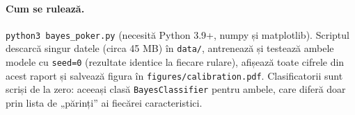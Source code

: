 \documentclass[10pt,a4paper]{article}
\begin{document}
\paragraph{Cum se rulează.} \texttt{python3 bayes\_poker.py} (necesită
Python 3.9+, numpy și matplotlib). Scriptul descarcă singur datele (circa
45 MB) în \texttt{data/}, antrenează și testează ambele modele cu
\texttt{seed=0} (rezultate identice la fiecare rulare), afișează toate cifrele
din acest raport și salvează figura în \texttt{figures/calibration.pdf}.
Clasificatorii sunt scriși de la zero: aceeași clasă \texttt{BayesClassifier}
pentru ambele, care diferă doar prin lista de „părinți'' ai fiecărei
caracteristici.
\end{document}
